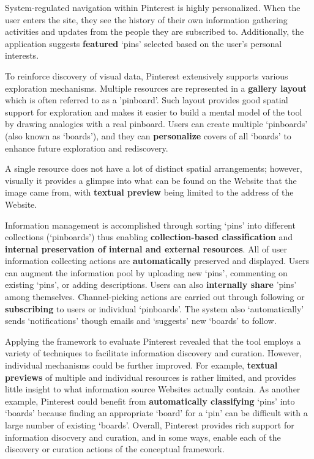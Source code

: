 {System-regulated navigation within Pinterest is highly personalized. When the user enters the site, they see the history of their own information gathering activities and updates from the people they are subscribed to. Additionally, the application suggests \textbf{featured} `pins' selected based on the user's personal interests.

To reinforce discovery of visual data, Pinterest extensively supports various exploration mechanisms. Multiple resources are represented in a \textbf{gallery layout} which is often referred to as a 'pinboard'. Such layout provides good spatial support for exploration and makes it easier to build a mental model of the tool by drawing analogies with a real pinboard. Users can create multiple `pinboards' (also known as `boards'), and they can \textbf{personalize} covers of all `boards' to enhance future exploration and rediscovery.

A single resource does not have a lot of distinct spatial arrangements; however, visually it provides a glimpse into what can be found on the Website that the image came from, with \textbf{textual preview} being limited to the address of the Website. 

Information management is accomplished through sorting `pins' into different collections (`pinboards') thus enabling \textbf{collection-based classification} and \textbf{internal preservation of internal and external resources}. All of user information collecting actions are \textbf{automatically} preserved and displayed. Users can augment the information pool by uploading new `pins', commenting on existing `pins', or adding descriptions. Users can also \textbf{internally share} 'pins' among themselves. Channel-picking actions are carried out through following or \textbf{subscribing} to users or individual `pinboards'. The system also `automatically' sends `notifications' though emails and `suggests' new `boards' to follow.

Applying the framework to evaluate Pinterest revealed that the tool employs a  variety of techniques to facilitate information discovery and curation. However, individual mechanisms could be further improved. For example, \textbf{textual previews} of multiple and individual resources is rather limited, and provides little insight to what information source Websites actually contain. As another example, Pinterest could benefit from \textbf{automatically classifying} `pins' into `boards' because finding an appropriate `board' for a `pin' can be difficult with a large number of existing `boards'. Overall, Pinterest provides rich support for information disocvery and curation, and in some ways, enable each of the discovery or curation actions of the conceptual framework. 
} %



